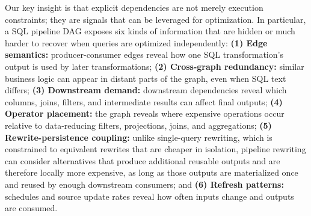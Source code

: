\label{sec:dependencies-as-signals}
Our key insight is that explicit dependencies are not merely execution constraints; they are  signals that can be leveraged for optimization.
In particular, a SQL pipeline DAG exposes six kinds of information that are hidden or much harder to recover when queries are optimized independently: \textbf{(1) Edge semantics:} producer-consumer edges reveal how one SQL transformation's output is used by later transformations; \textbf{(2) Cross-graph redundancy:} similar business logic can appear in distant parts of the graph, even when SQL text differs; \textbf{(3) Downstream demand:} downstream dependencies reveal which columns, joins, filters, and intermediate results can affect final outputs; \textbf{(4) Operator placement:} the graph reveals where expensive operations occur relative to data-reducing filters, projections, joins, and aggregations; 
\textbf{(5) Rewrite-persistence coupling:} unlike single-query rewriting, which is constrained to equivalent rewrites that are cheaper in isolation, pipeline rewriting can consider alternatives that produce additional reusable outputs and are therefore locally more expensive, as long as those outputs are materialized once and reused by enough downstream consumers; and \textbf{(6) Refresh patterns:} schedules and source update rates reveal how often inputs change and outputs are consumed. 




